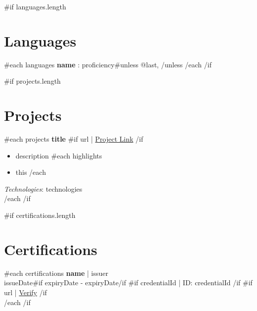 \documentclass[11pt,a4paper]{article}
\begin{document}
{{#if languages.length}}
    \section*{Languages}
    {{#each languages}}
        \textbf{ {{name}} }: {{proficiency}}{{#unless @last}}, {{/unless}}
    {{/each}}
{{/if}}

{{#if projects.length}}
    \section*{Projects}
    {{#each projects}}
        \textbf{ {{title}} }
        {{#if url}}
            | \href{ {{url}} }{Project Link}
        {{/if}}
        \begin{itemize}
            \item {{description}}
            {{#each highlights}}
                \item {{this}}
            {{/each}}
        \end{itemize}
        \textit{Technologies}: {{technologies}}\\
    {{/each}}
{{/if}}

{{#if certifications.length}}
    \section*{Certifications}
    {{#each certifications}}
        \textbf{ {{name}} } | {{issuer}}\\
        {{issueDate}}{{#if expiryDate}} - {{expiryDate}}{{/if}}
        {{#if credentialId}}
            | ID: {{credentialId}}
        {{/if}}
        {{#if url}}
            | \href{ {{url}} }{Verify}
        {{/if}}\\
    {{/each}}
{{/if}}
\end{document}
